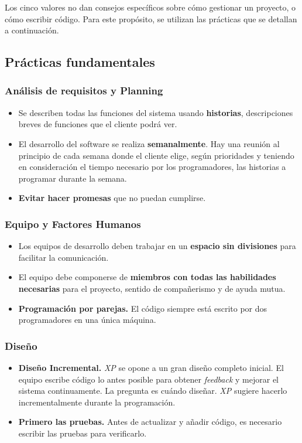 Los cinco valores no dan consejos específicos sobre cómo gestionar un proyecto, o cómo 
escribir código. Para este propósito, se utilizan las prácticas que se detallan a continuación.

\subsection{Prácticas fundamentales}
\subsubsection{Análisis de requisitos y Planning}
\begin{itemize}
\item Se describen todas las funciones del sistema usando \textbf{historias}, descripciones breves de funciones que el cliente podrá ver.
\item El desarrollo del software se realiza \textbf{semanalmente}. Hay una reunión al principio de cada semana donde el cliente elige, según prioridades y teniendo en consideración el tiempo necesario por los programadores, las historias a programar durante la semana.
\item \textbf{Evitar hacer promesas} que no puedan cumplirse. 
\end{itemize}

\subsubsection{Equipo y Factores Humanos}
\begin{itemize}
\item Los equipos de desarrollo deben trabajar en un \textbf{espacio sin divisiones} para facilitar la comunicación.
\item El equipo debe componerse de \textbf{miembros con todas las habilidades necesarias} para el proyecto, sentido de compañerismo y de ayuda mutua. 
\item \textbf{Programación por parejas.} El código siempre está escrito por dos programadores en una única máquina.
\end{itemize}

\subsubsection{Diseño}
\begin{itemize}
\item \textbf{Diseño Incremental.} \textit{XP} se opone a un gran diseño completo inicial. El equipo escribe código lo antes posible para obtener \textit{feedback} y mejorar el sistema continuamente. La pregunta es cuándo diseñar. \textit{XP} sugiere hacerlo incrementalmente durante la programación.
\item \textbf{Primero las pruebas.} Antes de actualizar y añadir código, es necesario escribir las pruebas para verificarlo. 
\end{itemize}
